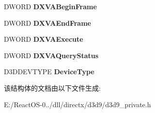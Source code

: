 \begin{DoxyCompactItemize}
D\+W\+O\+RD {\bfseries D\+X\+V\+A\+Begin\+Frame}
\item 
\mbox{\label{struct__tag_d3_d9___c_a_l_l_b_a_c_k_s_a4fbeb93a1ec9a17051f136eeef4d01f3}} 
D\+W\+O\+RD {\bfseries D\+X\+V\+A\+End\+Frame}
\item 
\mbox{\label{struct__tag_d3_d9___c_a_l_l_b_a_c_k_s_a8a893d4cddb1603742a57670f4ba5d41}} 
D\+W\+O\+RD {\bfseries D\+X\+V\+A\+Execute}
\item 
\mbox{\label{struct__tag_d3_d9___c_a_l_l_b_a_c_k_s_a9b7adb415cdeba4c151f9f79a7ab12c7}} 
D\+W\+O\+RD {\bfseries D\+X\+V\+A\+Query\+Status}
\item 
\mbox{\label{struct__tag_d3_d9___c_a_l_l_b_a_c_k_s_a1dce116476b0066fe66a3ab172933cc9}} 
D3\+D\+D\+E\+V\+T\+Y\+PE {\bfseries Device\+Type}
\end{DoxyCompactItemize}


该结构体的文档由以下文件生成\+:\begin{DoxyCompactItemize}
\item 
E\+:/\+React\+O\+S-\/0../dll/directx/d3d9/d3d9\+\_\+private.\+h\end{DoxyCompactItemize}
